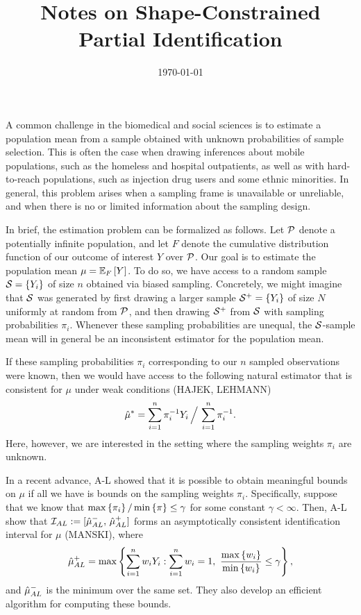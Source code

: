 \documentclass{article}
\author{}
\date{\today}
\title{Notes on Shape-Constrained Partial Identification}
\theoremstyle{plain}
\theoremstyle{definition}
\theoremstyle{remark}
\begin{document}
\maketitle

A common challenge in the biomedical and social sciences is to estimate a population mean
from a sample obtained with unknown probabilities of sample selection. This is often the case
when drawing inferences about mobile populations, such as the homeless and hospital outpatients,
as well as with hard-to-reach populations, such as injection drug users and some ethnic
minorities. In general, this problem arises when a sampling frame is unavailable or unreliable,
and when there is no or limited information about the sampling design.

In brief, the estimation problem can be formalized as follows. Let $\pp$ denote a potentially
infinite population, and let $F$ denote the cumulative distribution function of our outcome
of interest $Y$ over $\pp$. Our goal is to estimate the population mean $\mu = \EE[F]{Y}$.
To do so, we have access to a random sample $\set = \cb{Y_i}$ of size $n$ obtained via biased
sampling. Concretely, we might imagine that $\set$ was generated by first drawing a larger sample
$\set^+ = \cb{Y_i}$ of size $N$ uniformly at random from $\pp$, and then drawing $\set^+$ from $\set$
with sampling probabilities $\pi_i$. Whenever these sampling probabilities are
unequal, the $\set$-sample mean will in general be an inconsistent estimator for the population mean.

If these sampling probabilities $\pi_i$ corresponding to our $n$ sampled observations were known,
then we would have access to the following natural estimator that is consistent for $\mu$
under weak conditions (HAJEK, LEHMANN)
\begin{equation}
\label{eq:hajek}
\hmu^* = \sum_{i = 1}^n \pi_i^{-1} Y_i \, \Big/ \, \sum_{i = 1}^n \pi_i^{-1}.
\end{equation}
Here, however, we are interested in the setting where the sampling weights $\pi_i$ are unknown.

In a recent advance, A-L showed that it is possible to obtain meaningful bounds on $\mu$ if all we
have is bounds on the sampling weights $\pi_i$. Specifically, suppose that we know that
$\max\cb{\pi_i} / \min\cb{\pi} \leq \gamma$ for some constant $\gamma < \infty$. Then,
A-L show that $\ii_{AL} := [\hmu_{AL}^-,\, \hmu_{AL}^+]$ forms an asymptotically consistent
identification interval for $\mu$ (MANSKI), where
\begin{equation}
\label{eq:AL}
\hmu_{AL}^+ = \max\cb{\sum_{i = 1}^n w_i Y_i : \sum_{i = 1}^n w_i = 1, \ \frac{\max\cb{w_i}}{\min\cb{w_i}} \leq \gamma},
\end{equation}
and $\hmu_{AL}^-$ is the minimum over the same set. They also develop an efficient algorithm for
computing these bounds.
\end{document}
